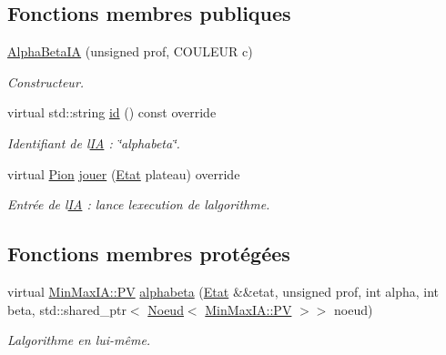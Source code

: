 \subsection*{Fonctions membres publiques}
\begin{DoxyCompactItemize}
\item 
\hyperlink{classAlphaBetaIA_affceed21fffddfe4768ce7266810e911}{Alpha\+Beta\+IA} (unsigned prof, C\+O\+U\+L\+E\+UR c)\hypertarget{classAlphaBetaIA_affceed21fffddfe4768ce7266810e911}{}\label{classAlphaBetaIA_affceed21fffddfe4768ce7266810e911}

\begin{DoxyCompactList}\small\item\em Constructeur. \end{DoxyCompactList}\item 
virtual std\+::string \hyperlink{classAlphaBetaIA_acdf19af08e9d5c2f3fc59015e5eebf9f}{id} () const override\hypertarget{classAlphaBetaIA_acdf19af08e9d5c2f3fc59015e5eebf9f}{}\label{classAlphaBetaIA_acdf19af08e9d5c2f3fc59015e5eebf9f}

\begin{DoxyCompactList}\small\item\em Identifiant de l\textquotesingle{}\hyperlink{classIA}{IA} \+: \char`\"{}alphabeta\char`\"{}. \end{DoxyCompactList}\item 
virtual \hyperlink{structPion}{Pion} \hyperlink{classAlphaBetaIA_a33c975e65d1bec468c179972ecb1062c}{jouer} (\hyperlink{structEtat}{Etat} plateau) override\hypertarget{classAlphaBetaIA_a33c975e65d1bec468c179972ecb1062c}{}\label{classAlphaBetaIA_a33c975e65d1bec468c179972ecb1062c}

\begin{DoxyCompactList}\small\item\em Entrée de l\textquotesingle{}\hyperlink{classIA}{IA} \+: lance l\textquotesingle{}execution de l\textquotesingle{}algorithme. \end{DoxyCompactList}\end{DoxyCompactItemize}
\subsection*{Fonctions membres protégées}
\begin{DoxyCompactItemize}
\item 
virtual \hyperlink{structIA_1_1PV}{Min\+Max\+I\+A\+::\+PV} \hyperlink{classAlphaBetaIA_a68f594c3a3a675ba9ed9a06cb14472cc}{alphabeta} (\hyperlink{structEtat}{Etat} \&\&etat, unsigned prof, int alpha, int beta, std\+::shared\+\_\+ptr$<$ \hyperlink{classNoeud}{Noeud}$<$ \hyperlink{structIA_1_1PV}{Min\+Max\+I\+A\+::\+PV} $>$$>$ noeud)\hypertarget{classAlphaBetaIA_a68f594c3a3a675ba9ed9a06cb14472cc}{}\label{classAlphaBetaIA_a68f594c3a3a675ba9ed9a06cb14472cc}

\begin{DoxyCompactList}\small\item\em L\textquotesingle{}algorithme en lui-\/même. \end{DoxyCompactList}\end{DoxyCompactItemize}
